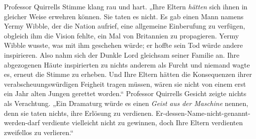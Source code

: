 Professor Quirrells Stimme klang rau und hart. „Ihre Eltern \emph{hätten} sich ihnen in gleicher Weise erwehren können. Sie taten es nicht. Es gab einen Mann namens Yermy Wibble, der die Nation aufrief, eine allgemeine Einberufung zu verfügen, obgleich ihm die Vision fehlte, ein Mal von Britannien zu propagieren. Yermy Wibble wusste, was mit ihm geschehen würde; er hoffte sein Tod würde andere inspirieren. Also nahm sich der Dunkle Lord gleichsam seiner Familie an. Ihre abgezogenen Häute inspirierten zu nichts anderem als Furcht und niemand wagte es, erneut die Stimme zu erheben. Und Ihre Eltern hätten die Konsequenzen ihrer verabscheuungswürdigen Feigheit tragen müssen, wären sie nicht von einem erst ein Jahr alten Jungen gerettet worden.“ Professor Quirrells Gesicht zeigte nichts als Verachtung. „Ein Dramaturg würde es einen \emph{Geist aus der Maschine} nennen, denn sie taten nichts, ihre Erlösung zu verdienen. Er-dessen-Name-nicht-genannt-werden-darf verdiente vielleicht nicht zu gewinnen, doch Ihre Eltern verdienten zweifellos zu verlieren.“

